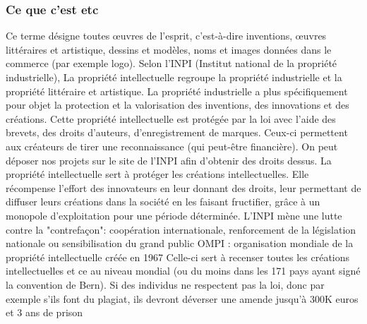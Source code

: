 \documentclass{article}
\begin{document}
\subsubsection{Ce que c'est etc}
Ce terme désigne toutes œuvres de l’esprit, c’est-à-dire inventions, œuvres littéraires et artistique,
dessins et modèles, noms et images données dans le commerce (par exemple logo).
Selon l'INPI (Institut national de la propriété industrielle), La propriété intellectuelle regroupe la propriété industrielle et la propriété littéraire et artistique. La propriété industrielle a plus spécifiquement pour objet la protection et la valorisation des inventions, des innovations et des créations.
Cette propriété intellectuelle est protégée par la loi avec l’aide des brevets, des droits d’auteurs, d’enregistrement de marques. Ceux-ci permettent aux créateurs de tirer une reconnaissance (qui peut-être financière).
On peut déposer nos projets sur le site de l'INPI afin d'obtenir des droits dessus.
La propriété intellectuelle sert à protéger les créations intellectuelles. Elle récompense l’effort des innovateurs en leur donnant des droits, leur permettant de diffuser leurs créations dans la société en les faisant fructifier, grâce à un monopole d'exploitation pour une période déterminée.
L'INPI mène une lutte contre la "contrefaçon": coopération internationale, renforcement de la législation nationale ou sensibilisation du grand public
OMPI : organisation mondiale de la propriété intellectuelle créée en 1967
Celle-ci sert à recenser toutes les créations intellectuelles et ce au niveau mondial (ou du moins dans
les 171 pays ayant signé la convention de Bern).
Si des individus ne respectent pas la loi, donc par exemple s’ils font du plagiat, ils devront déverser une amende jusqu’à 300K euros et 3 ans de prison
\end{document}
